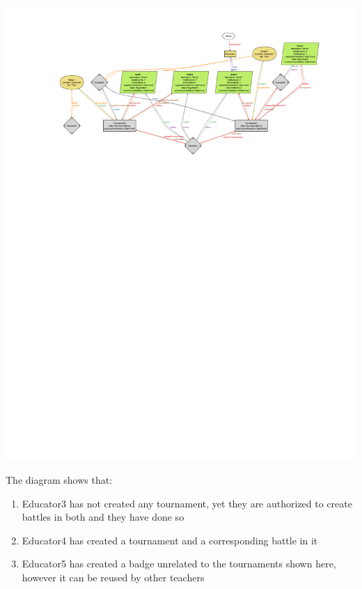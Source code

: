 \begin{enumerate}[label=,leftmargin=0cm]
          \begin{adjustbox}{max size={\textwidth}{\textheight}}
              \includegraphics[trim=90 525 60 40, clip]{alloy/manage_tournaments.pdf}
          \end{adjustbox}
          
          The diagram shows that:
          \begin{enumerate}
              \item Educator3 has not created any tournament, yet they are authorized
                    to create battles in both and they have done so
              \item Educator4 has created a tournament and a corresponding battle in it
              \item Educator5 has created a badge unrelated to the tournaments shown here,
                    however it can be reused by other teachers
          \end{enumerate}
\end{enumerate}